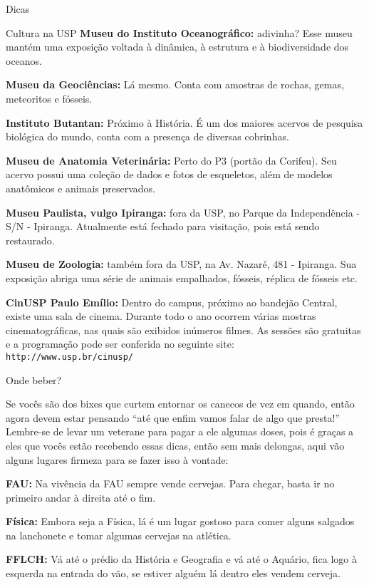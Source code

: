 \begin{secao}{Dicas}
\begin{subsecao}{Cultura na USP}
{\bf Museu do Instituto Oceanográfico:} adivinha? Esse museu mantém uma exposição voltada
à dinâmica, à estrutura e à biodiversidade dos oceanos.

{\bf Museu da Geociências:} Lá mesmo. Conta com amostras de rochas, gemas, meteoritos 
e fósseis.

{\bf Instituto Butantan:} Próximo à História. É um dos maiores acervos de pesquisa
biológica do mundo, conta com a presença de diversas cobrinhas.

{\bf Museu de Anatomia Veterinária:} Perto do P3 (portão da Corifeu). Seu acervo possui
uma coleção de dados e fotos de esqueletos, além de modelos anatômicos e animais
preservados.

{\bf Museu Paulista, vulgo Ipiranga:} fora da USP, no Parque da
Independência - S/N  - Ipiranga. Atualmente está fechado para visitação,
pois está sendo restaurado.

{\bf Museu de Zoologia:} também fora da USP, na Av. Nazaré, 481  -
Ipiranga. Sua exposição abriga uma série de animais empalhados, fósseis,
réplica de fósseis etc.

{\bf CinUSP Paulo Emílio:} Dentro do campus, próximo ao bandejão Central, existe uma sala de cinema. Durante todo o ano ocorrem várias mostras cinematográficas, nas quais são exibidos inúmeros filmes. As sessões são gratuitas e a programação pode ser conferida no seguinte site: {\tt http://www.usp.br/cinusp/}


\end{subsecao}

\begin{subsecao}{Onde beber?}

Se vocês são dos bixes que curtem entornar os canecos de vez em quando, então
agora devem estar pensando ``até que enfim vamos falar de algo que presta!''
Lembre-se de levar um veterane para pagar a ele algumas doses, pois é graças a
eles que vocês estão recebendo essas dicas, então sem mais delongas, aqui vão
alguns lugares firmeza para se fazer isso à vontade:

{\bf FAU:} Na vivência da FAU sempre vende cervejas. Para chegar, basta ir no 
primeiro andar à direita até o fim.

{\bf Física:} Embora seja a Física, lá é um lugar gostoso para comer alguns
salgados na lanchonete e tomar algumas cervejas na atlética.

{\bf FFLCH:} Vá até o prédio da História e Geografia e vá até o Aquário, fica 
logo à esquerda na entrada do vão, se estiver alguém lá dentro eles vendem cerveja.


\end{subsecao}
\end{secao}
